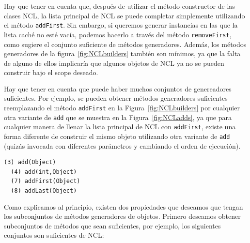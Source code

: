  Hay que tener en cuenta que, después de utilizar el método constructor de las clases NCL, la lista principal de NCL se puede completar simplemente utilizando el método \texttt{addFirst}. Sin embargo, si queremos generar instancias en las que la lista caché no esté vacía, podemos hacerlo a través del método \texttt{removeFirst}, como sugiere el conjunto suficiente de métodos generadores. Además, los métodos generadores de la figura~\ref{fig:NCLbuilders} también son mínimos, ya que la falta de alguno de ellos implicaría que algunos objetos de NCL ya no se pueden construir bajo el scope deseado.

Hay que tener en cuenta que puede haber muchos conjuntos de genereadores suficientes. Por ejemplo, se pueden obtener métodos generadores suficientes reemplazando el método \texttt{addFirst} en la Figura~\ref{fig:NCLbuilders} por cualquier otra variante de \texttt{add} que se muestra en la Figura~\ref{fig:NCLadds}, ya que para cualquier manera de llenar la lista principal de NCL con \texttt{addFirst}, existe una forma diferente de construir el mismo objeto utilizando otra variante de \texttt{add} (quizás invocada con diferentes parámetros y cambiando el orden de ejecución).
\\
\begin{lstlisting}[numbers=none,label=fig:NCLadds, caption=Variantes del método 'Add' que puedo ser utilizado para rellanar la lista principal en NCL, captionpos=b, frame=tb , basicstyle=\scriptsize]
  (3) add(Object)
  (4) add(int,Object)
  (7) addFirst(Object)
  (8) addLast(Object)
\end{lstlisting}


Como explicamos al principio, existen dos propiedades que deseamos que tengan los subconjuntos de métodos generadores de objetos. Primero deseamos obtener subconjuntos de métodos que sean suficientes, por ejemplo, los siguientes conjuntos son suficientes de NCL:
\\

